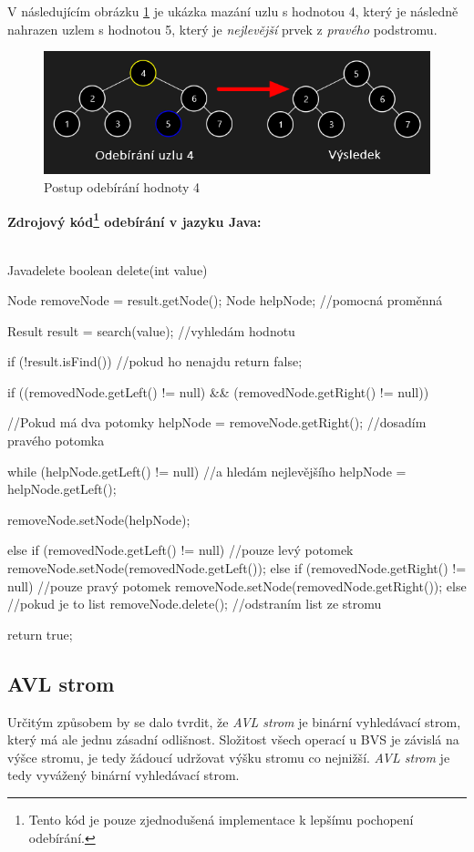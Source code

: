 \documentclass[
  biblatex=false,
  font=serif,
  glossaries=false,
  tables=false,
  theorems=false,
  index
]{kidiplom}
\begin{document}
\medskip
\noindent V následujícím obrázku \ref{binaryDelete} je ukázka mazání uzlu s hodnotou 4, který je následně nahrazen uzlem s hodnotou 5, který je \textit{nejlevější} prvek z \textit{pravého} podstromu.

\begin{figure}[h!]
\centering
	\includegraphics[scale=0.7]{obrazky/7BinarniMazani.png}
	\caption{Postup odebírání hodnoty 4}
	\label{binaryDelete}
\end{figure}

\newpage\noindent \textbf{Zdrojový kód\footnote{Tento kód je pouze zjednodušená implementace k lepšímu pochopení odebírání.} odebírání v jazyku Java:}\\\\

\begin{kicode}{Java}{}{delete}
boolean delete(int value) {
	Node removeNode = result.getNode();
	Node helpNode; //pomocná proměnná
	
	Result result = search(value); //vyhledám hodnotu
	
	if (!result.isFind()) {  //pokud ho nenajdu
		return false;
	}	
	
	if ((removedNode.getLeft() != null) && (removedNode.getRight() != null)) { //Pokud má dva potomky 
		helpNode = removeNode.getRight(); //dosadím pravého potomka	
			
		while (helpNode.getLeft() != null) { //a hledám nejlevějšího
			helpNode = helpNode.getLeft();
		}
		
		removeNode.setNode(helpNode);
	} else if (removedNode.getLeft() != null) { //pouze levý potomek
		removeNode.setNode(removedNode.getLeft());
	} else if (removedNode.getRight() != null) { //pouze pravý potomek
		removeNode.setNode(removedNode.getRight());
	} else { //pokud je to list   
		removeNode.delete(); //odstraním list ze stromu
	}        
	
	return true; 
}
\end{kicode} 

\newpage
\subsection{AVL strom}
\indent\indent Určitým způsobem by se dalo tvrdit, že \textit{AVL strom} je binární vyhledávací strom, který má ale jednu zásadní odlišnost. Složitost všech operací u BVS je závislá na výšce stromu, je tedy žádoucí udržovat výšku stromu co nejnižší. \textit{AVL strom} je tedy vyvážený binární vyhledávací strom. \\
\end{document}
